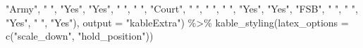 \documentclass[
  letterpaper,
  DIV=11,
  numbers=noendperiod]{scrartcl}
\newenvironment{Shaded}{\begin{snugshade}}{\end{snugshade}}
\newcommand{\AttributeTok}[1]{\textcolor[rgb]{0.40,0.45,0.13}{#1}}
\newcommand{\FunctionTok}[1]{\textcolor[rgb]{0.28,0.35,0.67}{#1}}
\newcommand{\NormalTok}[1]{\textcolor[rgb]{0.00,0.23,0.31}{#1}}
\newcommand{\SpecialCharTok}[1]{\textcolor[rgb]{0.37,0.37,0.37}{#1}}
\newcommand{\StringTok}[1]{\textcolor[rgb]{0.13,0.47,0.30}{#1}}
\begin{document}
\begin{Shaded}
\begin{Highlighting}[]
               \StringTok{"Army"}\NormalTok{, }\StringTok{" "}\NormalTok{, }\StringTok{"Yes"}\NormalTok{, }\StringTok{"Yes"}\NormalTok{, }\StringTok{" "}\NormalTok{, }\StringTok{" "}\NormalTok{,}
               \StringTok{"Court"}\NormalTok{, }\StringTok{" "}\NormalTok{, }\StringTok{" "}\NormalTok{, }\StringTok{" "}\NormalTok{, }\StringTok{"Yes"}\NormalTok{, }\StringTok{"Yes"}\NormalTok{,}
               \StringTok{"FSB"}\NormalTok{, }\StringTok{" "}\NormalTok{, }\StringTok{" "}\NormalTok{, }\StringTok{"Yes"}\NormalTok{, }\StringTok{" "}\NormalTok{, }\StringTok{"Yes"}\NormalTok{),}
             \AttributeTok{output =} \StringTok{"kableExtra"}\NormalTok{) }\SpecialCharTok{\%\textgreater{}\%} 
   \FunctionTok{kable\_styling}\NormalTok{(}\AttributeTok{latex\_options =} \FunctionTok{c}\NormalTok{(}\StringTok{"scale\_down"}\NormalTok{, }\StringTok{"hold\_position"}\NormalTok{))}
\end{Highlighting}
\end{Shaded}
\end{document}
